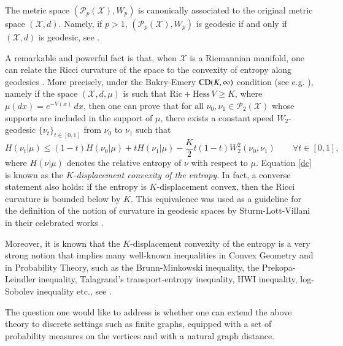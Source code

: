 \documentclass[11pt]{amsart}
\numberwithin{equation}{section}
\begin{document}
The metric space $({\mathcal P}_{p}({\mathcal{X}}), W_p)$ is canonically associated to the original metric space $({\mathcal{X}},d)$.
Namely, if $p>1$, $({\mathcal P}_{p}({\mathcal{X}}), W_p)$ is geodesic if and only if $({\mathcal{X}},d)$ is geodesic, see \cite{St06a}.

A remarkable and powerful fact is that, when ${\mathcal{X}}$ is a Riemannian manifold, one can relate the Ricci curvature of the space to the convexity of  entropy along geodesics \cite{mccann,cordero-ms,sturm-vonrenesse,LV09,sturm05,villani03}. 
 More precisely, under the Bakry-Emery ${\rm CD}(K, \infty)$ condition (see e.g. \cite{bakry}), namely if the space 
$({\mathcal{X}},d,\mu)$ is such that $\mathrm{Ric}+\mathrm{Hess}\,V\geq K$, where $\mu(dx)=e^{-V(x)}\,dx$, then one can prove that for all $\nu_0,\nu_1\in\mathcal{P}_{2}({\mathcal{X}})$ whose supports are included in the support of $\mu$, there exists a constant speed ${W}_{2}$-geodesic
$\{\nu_t\}_{t\in [0,1]}$ from $\nu_0$ to $\nu_1$  such that
\begin{equation} \label{dc}
H(\nu_t|\mu) \leq (1-t) H(\nu_0|\mu) + t H(\nu_1|\mu) - \frac{K}{2}t(1-t) {W}_2^2(\nu_0,\nu_1)  \qquad \forall  t\in [0,1], 
\end{equation}
where $H(\nu|\mu)$ denotes the relative entropy of $\nu$ with respect to  $\mu$. 
Equation \eqref{dc} is known as the \emph{$K$-displacement convexity of the entropy}.
In fact, a converse statement also holds: if the entropy is $K$-displacement convex, then the Ricci curvature is bounded below by $K$.  This equivalence was used as a guideline for the definition of the notion of curvature in geodesic spaces by Sturm-Lott-Villani in their celebrated works \cite{LV09,St06a,St06b}. 

Moreover,  it is known that the $K$-displacement convexity of the entropy is a very strong notion that implies many well-known
inequalities in Convex Geometry and in Probability Theory, such as the Brunn-Minkowski inequality, the Prekopa-Leindler inequality, Talagrand's transport-entropy inequality, HWI inequality, log-Sobolev inequality etc., see \cite{villani}.

\bigskip

The question one would like to address is whether one can extend the above theory to discrete settings such as finite graphs, equipped with a set of probability measures on the vertices and with a natural graph distance. 
\end{document}
